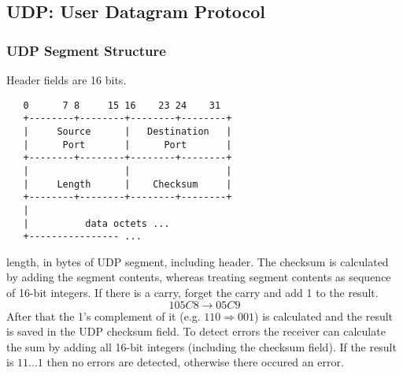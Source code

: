 \documentclass[10pt, a4paper, twocolumn]{scrartcl}
\begin{document}
\subsection{UDP: User Datagram Protocol}

\subsubsection{UDP Segment Structure}

Header fields are 16 bits.\\


\scriptsize
\begin{verbatim}
   0      7 8     15 16    23 24    31  
   +--------+--------+--------+--------+ 
   |     Source      |   Destination   | 
   |      Port       |      Port       | 
   +--------+--------+--------+--------+ 
   |                 |                 | 
   |     Length      |    Checksum     | 
   +--------+--------+--------+--------+ 
   |                                     
   |          data octets ...            
   +---------------- ...                 
\end{verbatim}
\normalsize

length, in bytes of UDP segment, including header. The checksum is calculated by adding the segment contents, whereas treating segment contents as sequence of 16-bit integers. If there is a carry, forget the carry and add 1 to the result.
\begin{displaymath}
	 105C8 \rightarrow 05C9 
\end{displaymath}
After that the 1's complement of it (e.g. $110 \Rightarrow 001$) is calculated and the result is saved in the UDP checksum field. To detect errors the receiver can calculate the sum by adding all 16-bit integers (including the checksum field). If the result is $11\ldots 1$ then no errors are detected, otherwise there occured an error.
\end{document}
